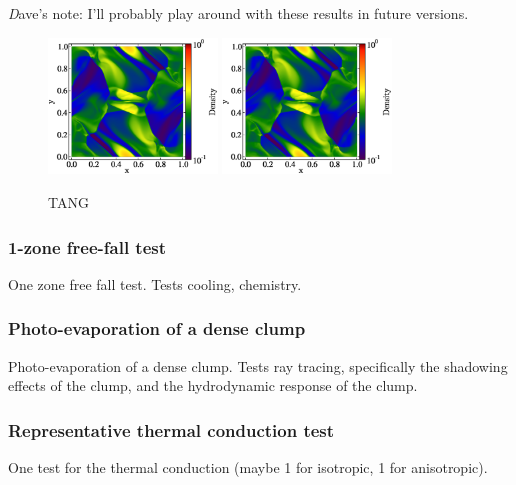 {\emph Dave's note:  I'll probably play around with these results in future
versions.}

\begin{figure}
\begin{center}
\includegraphics[width=0.4\textwidth]{figures/MHDCT_OrszagTang_Density.eps}
\includegraphics[width=0.4\textwidth]{figures/MHDDedner_OrszagTang_Density.eps}
\caption{TANG}
\label{fig.orszag}
\end{center}
\end{figure}


\subsubsection{1-zone free-fall test}
\label{sec.tests.freefall}
One zone free fall test.  Tests cooling, chemistry.

\subsubsection{Photo-evaporation of a dense clump}
\label{sec.tests.raytracing}
Photo-evaporation of a dense clump.  Tests ray tracing, specifically
the shadowing effects of the clump, and the hydrodynamic response of
the clump.





\subsubsection{Representative thermal conduction test}
\label{sec.tests.conduct}
One test for the thermal conduction (maybe 1 for isotropic, 1 for
anisotropic).
